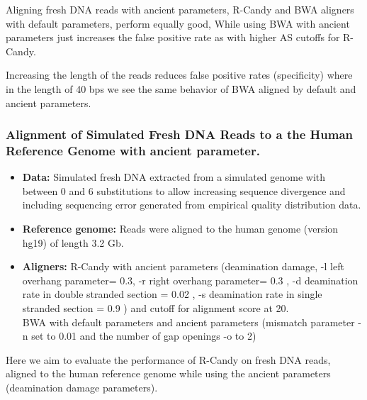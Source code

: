 \documentclass[11pt,a4paper]{report}
\begin{document}
Aligning fresh DNA reads with ancient parameters, 
R-Candy and BWA aligners with default parameters, perform equally good, 
While using BWA with ancient parameters just increases the 
false positive rate as with higher AS cutoffs for R-Candy.

Increasing the length of the reads reduces false positive rates (specificity)  
where in the length of 40 bps we see the same behavior of BWA
aligned by default and ancient parameters.




\subsubsection{ Alignment of Simulated Fresh DNA Reads to a the Human Reference Genome
with ancient parameter.}
\label{ Alignment of Simulated Fresh DNA Reads to a the Human Reference Genome.}

 \begin{itemize}
 
   \item \textbf{Data:} Simulated fresh DNA extracted from a simulated genome 
   with between 0 and 6 substitutions to allow increasing sequence divergence
   and including sequencing error generated from empirical quality distribution
   data.
   
   \item \textbf{Reference genome:} Reads were aligned to the human genome 
   (version hg19) of length 3.2 Gb.

    \item \textbf{Aligners:}
    R-Candy with ancient parameters 
  	(deamination damage, -l left overhang parameter= 0.3, -r right overhang parameter= 0.3 , 
	-d deamination rate in double stranded section = 0.02 , 
	-s deamination rate in single stranded section = 0.9 )
  	and cutoff for alignment score at 20. \\
  	BWA with default parameters and ancient parameters \cite{green2010draft}
   	(mismatch parameter -n set to 0.01 and the number of gap openings -o
   	to 2)
   
 \end{itemize}
	
	
Here we aim to evaluate the performance of R-Candy on fresh DNA reads, 
aligned to the human reference genome while using the ancient parameters
(deamination damage parameters).
\end{document}

